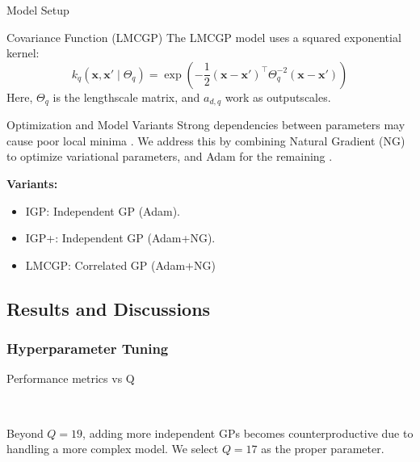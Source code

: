 \begin{frame}{Model Setup}

	\begin{block}{Covariance Function (LMCGP)}
		The LMCGP model uses a squared exponential kernel:
		\begin{equation*}
			k_{q}\left(\mathbf{x}, \mathbf{x'} \mid \Theta_q \right) = \exp\left(-\frac{1}{2}(\mathbf{x} - \mathbf{x'})^\top \Theta_q^{-2} (\mathbf{x} - \mathbf{x'})\right)
		\end{equation*}
		Here, \( \Theta_q \) is the lengthscale matrix, and \( a_{d, q} \) work as outputscales.
	\end{block}
	
	\begin{block}{Optimization and Model Variants}
		Strong dependencies between parameters may cause poor local minima \cite{giraldo2021fully}. We address this by combining Natural Gradient (NG) to optimize variational parameters, and Adam for the remaining \cite{pmlr-v84-salimbeni18a}.

		\textbf{Variants:}
		\begin{itemize}
			\item IGP: Independent GP (Adam).
			\item IGP+: Independent GP (Adam+NG).
			\item LMCGP: Correlated GP (Adam+NG)
		\end{itemize}
	\end{block}
\end{frame}



\subsection{Results and Discussions}

\subsubsection{Hyperparameter Tuning}

\begin{frame}{Performance metrics vs Q}
	\begin{figure}[htbp]
	\tiny
	\centering
	\setlength{} 
	\setlength{}
	
	\subfloat[MSE]{}\hspace{-0.1em}
	\subfloat[MSLL]{}\\
	\vspace{-0.1em} %
	
	\subfloat[CRPS]{}\hspace{-0.1em}
	\subfloat[NLPD]{}
	\end{figure}
	\vspace{-1em}
	\begin{block}{}
	 Beyond $Q=19$, adding more independent GPs becomes counterproductive due to handling a more complex model. We select $Q=17$ as the proper parameter.
	\end{block}
\end{frame}

